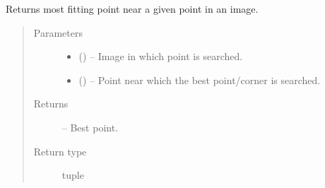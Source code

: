 \documentclass[letterpaper,10pt,english]{sphinxmanual}
\begin{document}
\begin{fulllineitems}
\label{\detokenize{image_sac:image_sac.getPointFromPoint}}
Returns most fitting point near a given point in an image.
\begin{quote}\begin{description}
\item[{Parameters}] \leavevmode\begin{itemize}
\item {} 
 () -- Image in which point is searched.

\item {} 
 () -- Point near which the best point/corner is searched.

\end{itemize}

\item[{Returns}] \leavevmode
{} -- Best point.

\item[{Return type}] \leavevmode
tuple

\end{description}\end{quote}

\end{fulllineitems}

\end{document}
